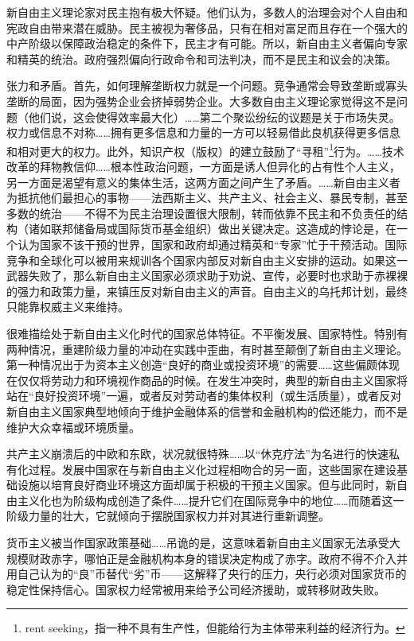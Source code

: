 新自由主义理论家对民主抱有极大怀疑。他们认为，多数人的治理会对个人自由和宪政自由带来潜在威胁。民主被视为奢侈品，只有在相对富足而且存在一个强大的中产阶级以保障政治稳定的条件下，民主才有可能。所以，新自由主义者偏向专家和精英的统治。政府强烈偏向行政命令和司法判决，而不是民主和议会的决策。

张力和矛盾。首先，如何理解垄断权力就是一个问题。竞争通常会导致垄断或寡头垄断的局面，因为强势企业会挤掉弱势企业。大多数自由主义理论家觉得这不是问题（他们说，这会使得效率最大化）……第二个聚讼纷纭的议题是关于市场失灵。权力或信息不对称……拥有更多信息和力量的一方可以轻易借此良机获得更多信息和相对更大的权力。此外，知识产权（版权）的建立鼓励了“寻租”\footnote{rent seeking，指一种不具有生产性，但能给行为主体带来利益的经济行为。}行为。……技术改革的拜物教信仰……根本性政治问题，一方面是诱人但异化的占有性个人主义，另一方面是渴望有意义的集体生活，这两方面之间产生了矛盾。……新自由主义者为抵抗他们最担心的事物——法西斯主义、共产主义、社会主义、暴民专制，甚至多数的统治——不得不为民主治理设置很大限制，转而依靠不民主和不负责任的结构（诸如联邦储备局或国际货币基金组织）做出关键决定。这造成的悖论是，在一个认为国家不该干预的世界，国家和政府却通过精英和“专家”忙于干预活动。国际竞争和全球化可以被用来规训各个国家内部反对新自由主义安排的运动。如果这一武器失败了，那么新自由主义国家必须求助于劝说、宣传，必要时也求助于赤裸裸的强力和政策力量，来镇压反对新自由主义的声音。自由主义的乌托邦计划，最终只能靠权威主义来维持。

很难描绘处于新自由主义化时代的国家总体特征。不平衡发展、国家特性。特别有两种情况，重建阶级力量的冲动在实践中歪曲，有时甚至颠倒了新自由主义理论。第一种情况出于为资本主义创造“良好的商业或投资环境”的需要……这些偏颇体现在仅仅将劳动力和环境视作商品的时候。在发生冲突时，典型的新自由主义国家将站在“良好投资环境”一遍，或者反对劳动者的集体权利（或生活质量），或者反对新自由主义国家典型地倾向于维护金融体系的信誉和金融机构的偿还能力，而不是维护大众幸福或环境质量。

共产主义崩溃后的中欧和东欧，状况就很特殊……以“休克疗法”为名进行的快速私有化过程。发展中国家在与新自由主义化过程相吻合的另一面，这些国家在建设基础设施以培育良好商业环境这方面却属于积极的干预主义国家。但与此同时，新自由主义化也为阶级构成创造了条件……提升它们在国际竞争中的地位……而随着这一阶级力量的壮大，它就倾向于摆脱国家权力并对其进行重新调整。

货币主义被当作国家政策基础……吊诡的是，这意味着新自由主义国家无法承受大规模财政赤字，哪怕正是金融机构本身的错误决定构成了赤字。政府不得不介入并用自己认为的“良”币替代“劣”币——这解释了央行的压力，央行必须对国家货币的稳定性保持信心。国家权力经常被用来给予公司经济援助，或转移财政失败。

